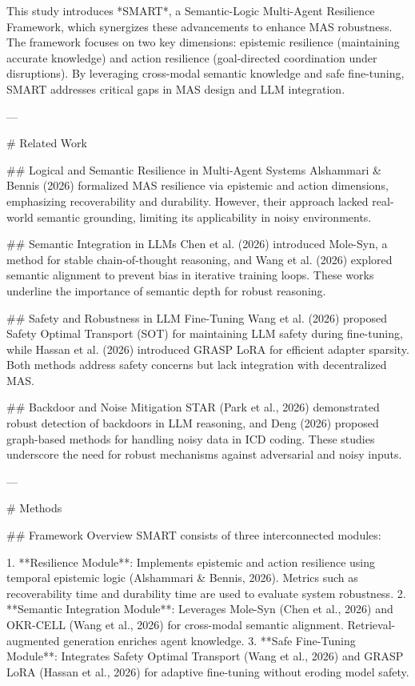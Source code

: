 This study introduces *SMART*, a Semantic-Logic Multi-Agent Resilience Framework, which synergizes these advancements to enhance MAS robustness. The framework focuses on two key dimensions: epistemic resilience (maintaining accurate knowledge) and action resilience (goal-directed coordination under disruptions). By leveraging cross-modal semantic knowledge and safe fine-tuning, SMART addresses critical gaps in MAS design and LLM integration.

---

# Related Work  

## Logical and Semantic Resilience in Multi-Agent Systems  
Alshammari & Bennis (2026) formalized MAS resilience via epistemic and action dimensions, emphasizing recoverability and durability. However, their approach lacked real-world semantic grounding, limiting its applicability in noisy environments.

## Semantic Integration in LLMs  
Chen et al. (2026) introduced Mole-Syn, a method for stable chain-of-thought reasoning, and Wang et al. (2026) explored semantic alignment to prevent bias in iterative training loops. These works underline the importance of semantic depth for robust reasoning.

## Safety and Robustness in LLM Fine-Tuning  
Wang et al. (2026) proposed Safety Optimal Transport (SOT) for maintaining LLM safety during fine-tuning, while Hassan et al. (2026) introduced GRASP LoRA for efficient adapter sparsity. Both methods address safety concerns but lack integration with decentralized MAS.

## Backdoor and Noise Mitigation  
STAR (Park et al., 2026) demonstrated robust detection of backdoors in LLM reasoning, and Deng (2026) proposed graph-based methods for handling noisy data in ICD coding. These studies underscore the need for robust mechanisms against adversarial and noisy inputs.

---

# Methods  

## Framework Overview  
SMART consists of three interconnected modules:

1. **Resilience Module**: Implements epistemic and action resilience using temporal epistemic logic (Alshammari & Bennis, 2026). Metrics such as recoverability time and durability time are used to evaluate system robustness.
2. **Semantic Integration Module**: Leverages Mole-Syn (Chen et al., 2026) and OKR-CELL (Wang et al., 2026) for cross-modal semantic alignment. Retrieval-augmented generation enriches agent knowledge.
3. **Safe Fine-Tuning Module**: Integrates Safety Optimal Transport (Wang et al., 2026) and GRASP LoRA (Hassan et al., 2026) for adaptive fine-tuning without eroding model safety.

